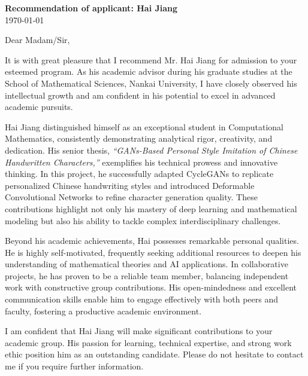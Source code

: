 \documentclass{article}
\begin{document}
\textbf{Recommendation of applicant: Hai Jiang}\\
\today \bigskip\\ %
\vspace{-3em}




\bigskip %
\vspace{10pt}


Dear Madam/Sir, 

It is with great pleasure that I recommend Mr. Hai Jiang for admission to your esteemed program. 
As his academic advisor during his graduate studies at the School of Mathematical Sciences, Nankai University, 
I have closely observed his intellectual growth and am confident in his potential to excel in advanced academic pursuits.

Hai Jiang distinguished himself as an exceptional student in Computational Mathematics, 
consistently demonstrating analytical rigor, creativity, and dedication. 
His senior thesis, \emph{``GANs-Based Personal Style Imitation of Chinese Handwritten Characters,''} 
exemplifies his technical prowess and innovative thinking. 
In this project, 
he successfully adapted CycleGANs to replicate personalized Chinese handwriting styles and introduced Deformable Convolutional Networks to refine character generation quality. 
These contributions highlight not only his mastery of deep learning and mathematical modeling but also his ability to tackle complex interdisciplinary challenges.

Beyond his academic achievements, Hai possesses remarkable personal qualities. 
He is highly self-motivated, frequently seeking additional resources to deepen his understanding of mathematical theories and AI applications. 
In collaborative projects, he has proven to be a reliable team member, balancing independent work with constructive group contributions. 
His open-mindedness and excellent communication skills enable him to engage effectively with both peers and faculty, fostering a productive academic environment.

I am confident that Hai Jiang will make significant contributions to your academic group. 
His passion for learning, technical expertise, and strong work ethic position him as an outstanding candidate. 
Please do not hesitate to contact me if you require further information.
\end{document}

